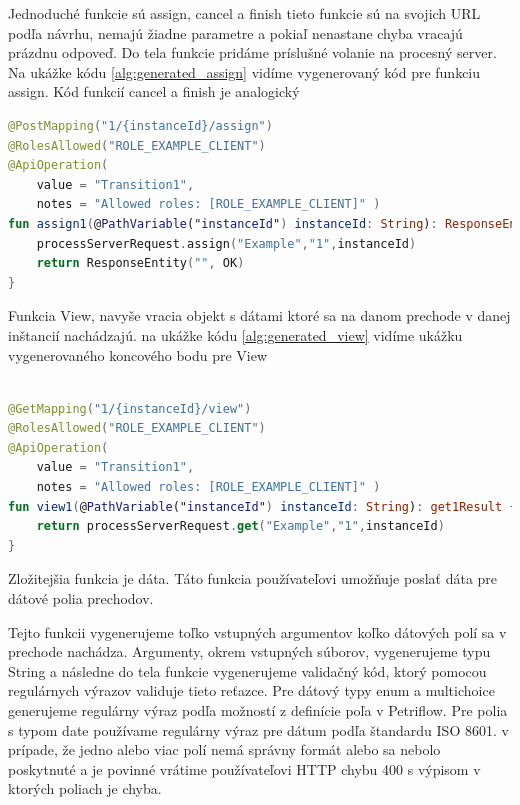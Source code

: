 Jednoduché funkcie sú assign, cancel a finish tieto funkcie sú na svojich URL podľa návrhu, nemajú žiadne parametre a pokiaľ nenastane chyba vracajú prázdnu odpoveď. Do tela funkcie pridáme príslušné volanie na procesný server. Na ukážke kódu \ref{alg:generated_assign} vidíme vygenerovaný kód pre funkciu assign. Kód funkcií cancel a finish je analogický  



\begin{lstlisting}[float, caption={Príklad vygenerovanej funkcie},label={alg:generated_assign},language=Kotlin] 
@PostMapping("1/{instanceId}/assign") 
@RolesAllowed("ROLE_EXAMPLE_CLIENT") 
@ApiOperation( 
	value = "Transition1", 
	notes = "Allowed roles: [ROLE_EXAMPLE_CLIENT]" ) 
fun assign1(@PathVariable("instanceId") instanceId: String): ResponseEntity<String> { 
	processServerRequest.assign("Example","1",instanceId) 
	return ResponseEntity("", OK) 
} 
\end{lstlisting} 

Funkcia View, navyše vracia objekt s dátami ktoré sa na danom prechode v danej inštancií nachádzajú. na ukážke kódu \ref{alg:generated_view} vidíme ukážku vygenerovaného koncového bodu pre View 


\begin{lstlisting}[float, caption={Príklad vygenerovanej funkcie},label={alg:generated_view},language=Kotlin] 

@GetMapping("1/{instanceId}/view") 
@RolesAllowed("ROLE_EXAMPLE_CLIENT") 
@ApiOperation( 
	value = "Transition1", 
	notes = "Allowed roles: [ROLE_EXAMPLE_CLIENT]" ) 
fun view1(@PathVariable("instanceId") instanceId: String): get1Result { 
	return processServerRequest.get("Example","1",instanceId) 
} 
\end{lstlisting} 




Zložitejšia funkcia je dáta. Táto funkcia používateľovi umožňuje poslať dáta pre dátové polia prechodov.  

Tejto funkcii vygenerujeme toľko vstupných argumentov koľko dátových polí sa v prechode nachádza. Argumenty, okrem vstupných súborov, vygenerujeme typu String a následne do tela funkcie vygenerujeme validačný kód, ktorý pomocou regulárnych výrazov validuje tieto reťazce. Pre dátový typy enum a multichoice generujeme regulárny výraz podľa možností z definície poľa v Petriflow. Pre polia s typom date používame regulárny výraz pre dátum podľa štandardu ISO 8601. v prípade, že jedno alebo viac polí nemá správny formát alebo sa nebolo poskytnuté a je povinné vrátime používateľovi HTTP chybu 400 s výpisom v ktorých poliach je chyba. 


